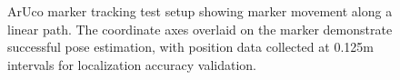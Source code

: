 \documentclass[11pt]{article}
\begin{document}
\begin{itemize}
\begin{figure}
{                }
                    \caption{ArUco marker tracking test setup showing marker movement along a linear path. The coordinate axes overlaid on the marker demonstrate successful pose estimation, with position data collected at 0.125m intervals for localization accuracy validation.}
                    \label{aruco test}
            \end{figure}
            

\end{itemize}
\end{document}
